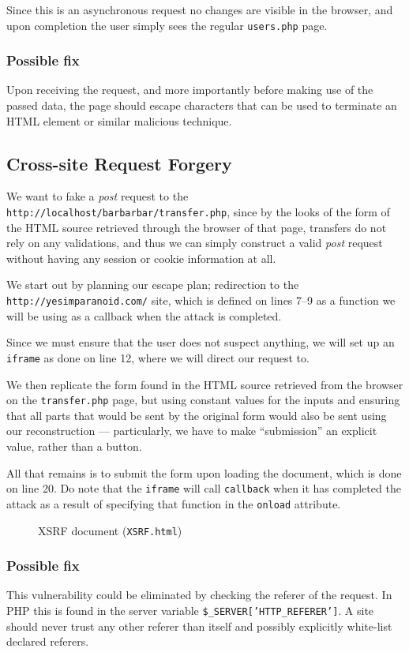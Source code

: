 \documentclass[11pt,a4paper]{article}
\newcommand{\code}[1]{{\tt #1}}
\newcommand{\file}[1]{{\tt #1}}
\begin{document}
Since this is an asynchronous request no changes are visible in the browser,
and upon completion the user simply sees the regular \file{users.php} page.

\subsubsection{Possible fix}
Upon receiving the request, and more importantly before making use of the
passed data, the page should escape characters that can be used to terminate
an HTML element or similar malicious technique.

\newpage
\subsection{Cross-site Request Forgery}
We want to fake a {\it post} request to the
{\tt http://localhost/barbarbar/transfer.php}, since by the looks of the form
of the HTML source retrieved through the browser of that page, transfers do
not rely on any validations, and thus we can simply construct a valid {\it
post} request without having any session or cookie information at all.

We start out by planning our escape plan; redirection to the {\tt
http://yesimparanoid.com/} site, which is defined on lines 7--9 as a function
we will be using as a callback when the attack is completed.

Since we must ensure that the user does not suspect anything, we will set up
an \code{iframe} as done on line 12, where we will direct our request to.

We then replicate the form found in the HTML source retrieved from the browser
on the \file{transfer.php} page, but using constant values for the inputs and
ensuring that all parts that would be sent by the original form would also be
sent using our reconstruction --- particularly, we have to make ``submission''
an explicit value, rather than a button.

All that remains is to submit the form upon loading the document, which is
done on line 20. Do note that the \code{iframe} will call \code{callback} when
it has completed the attack as a result of specifying that function in the
\code{onload} attribute.

\begin{figure}[H]
    
    \caption{XSRF document (\file{XSRF.html})}
\end{figure}

\subsubsection{Possible fix}
This vulnerability could be eliminated by checking the referer of the request.
In PHP this is found in the server variable \code{\$\_SERVER['HTTP\_REFERER']}.
A site should never trust any other referer than itself and possibly
explicitly white-list declared referers.
\end{document}
